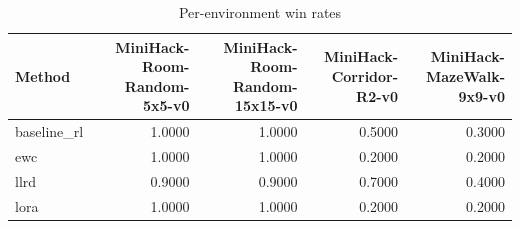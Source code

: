 \begin{table}[htbp]
\centering
\caption{Per-environment win rates}
\label{tab:per-env}
\begin{tabular}{lrrrr}
\toprule
\textbf{Method} & \textbf{MiniHack-Room-Random-5x5-v0} & \textbf{MiniHack-Room-Random-15x15-v0} & \textbf{MiniHack-Corridor-R2-v0} & \textbf{MiniHack-MazeWalk-9x9-v0} \\
\midrule
baseline\_rl & 1.0000 & 1.0000 & 0.5000 & 0.3000 \\
ewc & 1.0000 & 1.0000 & 0.2000 & 0.2000 \\
llrd & 0.9000 & 0.9000 & 0.7000 & 0.4000 \\
lora & 1.0000 & 1.0000 & 0.2000 & 0.2000 \\
\bottomrule
\end{tabular}
\end{table}